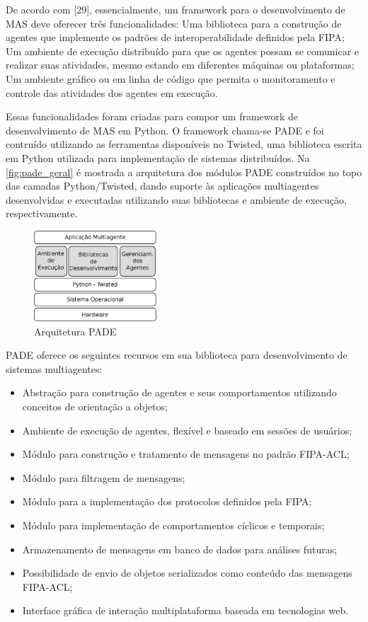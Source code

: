 \documentclass[journal]{IEEEtran}
\begin{document}
De acordo com [29], essencialmente, um framework para o desenvolvimento de MAS deve oferecer três funcionalidades:
Uma biblioteca para a construção de agentes que implemente os padrões de interoperabilidade definidos pela FIPA;
Um ambiente de execução distribuído para que os agentes possam se comunicar e realizar suas atividades, mesmo estando em diferentes máquinas ou plataformas;
Um ambiente gráfico ou em linha de código que permita o monitoramento e controle das atividades dos agentes em execução.

Essas funcionalidades foram criadas para compor um framework de desenvolvimento de MAS em Python. O framework chama-se PADE e foi contruído utilizando as ferramentas disponíveis no Twisted, uma biblioteca escrita em Python utilizada para implementação de sistemas distribuídos. Na \autoref{fig:pade_geral} é mostrada a arquitetura dos módulos PADE construídos no topo das camadas Python/Twisted, dando suporte às aplicações multiagentes desenvolvidas e executadas utilizando suas bibliotecas e ambiente de execução, respectivamente.

\begin{figure}[htb]
    \centering
    \includegraphics[width=1.8in]{Figuras/pade-visao-geral.eps}
    \caption{\label{fig:pade_geral} Arquitetura PADE}
\end{figure}


 PADE oferece os seguintes recursos em sua biblioteca para desenvolvimento de sistemas multiagentes:

 \begin{itemize}
   \item Abstração para construção de agentes e seus comportamentos utilizando conceitos de orientação a objetos;
  \item Ambiente de execução de agentes, flexível e baseado em sessões de usuários;
  \item Módulo para construção e tratamento de mensagens no padrão FIPA-ACL;
  \item Módulo para filtragem de mensagens;
  \item Módulo para a implementação dos protocolos definidos pela FIPA;
  \item Módulo para implementação de comportamentos cíclicos e temporais;
  \item Armazenamento de mensagens em banco de dados para análises futuras;
  \item Possibilidade de envio de objetos serializados como conteúdo das mensagens FIPA-ACL;
  \item Interface gráfica de interação multiplataforma baseada em tecnologias web.
 \end{itemize}
\end{document}
